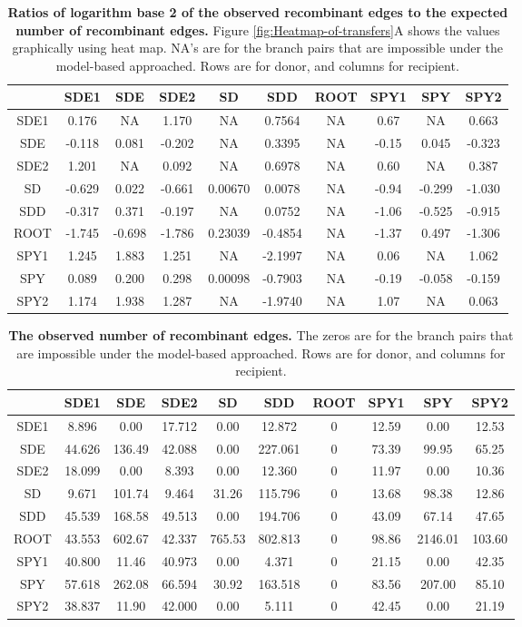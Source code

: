 \documentclass[12pt]{article}
\providecommand{\tabularnewline}{\\}
\begin{document}
\begin{table}[!ht]
\caption{
{\bf Ratios of logarithm base 2 of the observed
recombinant edges to the expected number of recombinant edges.}  Figure
\ref{fig:Heatmap-of-transfers}A shows the values graphically using heat map.
NA's are for the branch pairs that are impossible under the model-based
approached. Rows are for donor, and columns for recipient.}
\noindent \centering{}\begin{tabular}{cccccccccc}
\hline
& SDE1 & SDE & SDE2 & SD & SDD & ROOT & SPY1 & SPY & SPY2 \tabularnewline
\hline
SDE1& 0.176  &   NA  &1.170  &    NA & 0.7564  & NA & 0.67 &    NA & 0.663\tabularnewline
SDE & -0.118 & 0.081 &-0.202 &     NA&  0.3395 &  NA& -0.15&  0.045& -0.323\tabularnewline
SDE2& 1.201  &   NA  &0.092  &    NA & 0.6978  & NA & 0.60 &    NA & 0.387\tabularnewline
SD  & -0.629 & 0.022 &-0.661 &0.00670&  0.0078 &  NA& -0.94& -0.299& -1.030\tabularnewline
SDD & -0.317 & 0.371 &-0.197 &     NA&  0.0752 &  NA& -1.06& -0.525& -0.915\tabularnewline
ROOT& -1.745 &-0.698 &-1.786 &0.23039& -0.4854 &  NA& -1.37&  0.497& -1.306\tabularnewline
SPY1& 1.245  &1.883  &1.251  &    NA &-2.1997  & NA & 0.06 &    NA & 1.062\tabularnewline
SPY & 0.089  &0.200  &0.298 &0.00098 &-0.7903  & NA &-0.19 &-0.058 &-0.159\tabularnewline
SPY2& 1.174  &1.938  &1.287  &    NA &-1.9740  & NA & 1.07 &    NA & 0.063\tabularnewline
\hline
\end{tabular}
\label{tab:heatmap}
\end{table}

\begin{table}[!ht]
\caption{
{\bf The observed number of recombinant edges.}
The zeros are for the branch pairs that are impossible under the model-based
approached. Rows are for donor, and columns for recipient.}
\noindent \centering{}\begin{tabular}{cccccccccc}
\hline
& SDE1 & SDE & SDE2 & SD & SDD & ROOT & SPY1 & SPY & SPY2 \tabularnewline
\hline
SDE1&8.896 &  0.00 &17.712  & 0.00 & 12.872   & 0 &12.59  &  0.00  &12.53\tabularnewline
SDE &44.626& 136.49& 42.088 &  0.00& 227.061  &  0& 73.39 &  99.95 & 65.25\tabularnewline
SDE2&18.099&   0.00&  8.393 &  0.00&  12.360  &  0& 11.97 &   0.00 & 10.36\tabularnewline
SD  &9.671 &101.74 & 9.464  &31.26 &115.796   & 0 &13.68  & 98.38  &12.86\tabularnewline
SDD &45.539& 168.58& 49.513 &  0.00& 194.706  &  0& 43.09 &  67.14 & 47.65\tabularnewline
ROOT&43.553& 602.67& 42.337 &765.53& 802.813  &  0& 98.86 &2146.01 &103.60\tabularnewline
SPY1&40.800&  11.46& 40.973 &  0.00&   4.371  &  0& 21.15 &   0.00 & 42.35\tabularnewline
SPY &57.618& 262.08& 66.594 & 30.92& 163.518  &  0& 83.56 & 207.00 & 85.10\tabularnewline
SPY2&38.837&  11.90& 42.000 &  0.00&   5.111  &  0& 42.45 &   0.00 & 21.19\tabularnewline
\hline
\end{tabular}
\label{tab:obsheatmap}
\end{table}
\end{document}
